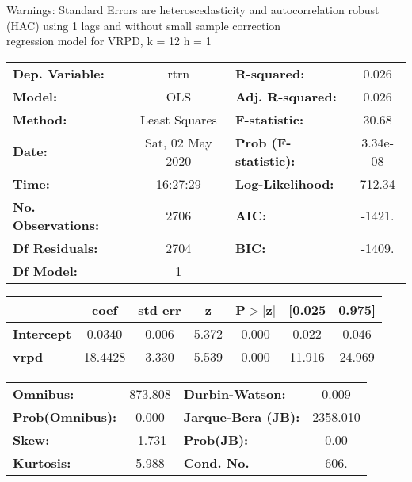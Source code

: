 Warnings: \newline
 [1] Standard Errors are heteroscedasticity and autocorrelation robust (HAC) using 1 lags and without small sample correction\\ 

regression model for VRPD, k = 12 h = 1\begin{center}
\begin{tabular}{lclc}
\toprule
\textbf{Dep. Variable:}    &       rtrn       & \textbf{  R-squared:         } &     0.026   \\
\textbf{Model:}            &       OLS        & \textbf{  Adj. R-squared:    } &     0.026   \\
\textbf{Method:}           &  Least Squares   & \textbf{  F-statistic:       } &     30.68   \\
\textbf{Date:}             & Sat, 02 May 2020 & \textbf{  Prob (F-statistic):} &  3.34e-08   \\
\textbf{Time:}             &     16:27:29     & \textbf{  Log-Likelihood:    } &    712.34   \\
\textbf{No. Observations:} &        2706      & \textbf{  AIC:               } &    -1421.   \\
\textbf{Df Residuals:}     &        2704      & \textbf{  BIC:               } &    -1409.   \\
\textbf{Df Model:}         &           1      & \textbf{                     } &             \\
\bottomrule
\end{tabular}
\begin{tabular}{lcccccc}
                   & \textbf{coef} & \textbf{std err} & \textbf{z} & \textbf{P$> |$z$|$} & \textbf{[0.025} & \textbf{0.975]}  \\
\midrule
\textbf{Intercept} &       0.0340  &        0.006     &     5.372  &         0.000        &        0.022    &        0.046     \\
\textbf{vrpd}      &      18.4428  &        3.330     &     5.539  &         0.000        &       11.916    &       24.969     \\
\bottomrule
\end{tabular}
\begin{tabular}{lclc}
\textbf{Omnibus:}       & 873.808 & \textbf{  Durbin-Watson:     } &    0.009  \\
\textbf{Prob(Omnibus):} &   0.000 & \textbf{  Jarque-Bera (JB):  } & 2358.010  \\
\textbf{Skew:}          &  -1.731 & \textbf{  Prob(JB):          } &     0.00  \\
\textbf{Kurtosis:}      &   5.988 & \textbf{  Cond. No.          } &     606.  \\
\bottomrule
\end{tabular}
\end{center}


